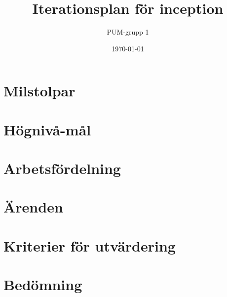 

\ifpdf
\else
\fi

\title{Iterationsplan för inception}
\author{PUM-grupp 1}
\date{\today}



\maketitle\thispagestyle{empty}
\newpage

\section{Milstolpar}

\section{Högnivå-mål}

\section{Arbetsfördelning}

\section{Ärenden}

\section{Kriterier för utvärdering}

\section{Bedömning}



